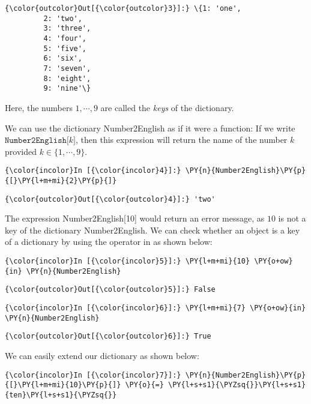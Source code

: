 \begin{Verbatim}[commandchars=\\\{\}]
{\color{outcolor}Out[{\color{outcolor}3}]:} \{1: 'one',
         2: 'two',
         3: 'three',
         4: 'four',
         5: 'five',
         6: 'six',
         7: 'seven',
         8: 'eight',
         9: 'nine'\}
\end{Verbatim}
Here, the numbers \(1, \cdots, 9\) are called the \emph{keys} of the dictionary.

We can use the dictionary Number2English as if it were a function: If we
write \(\texttt{Number2English[}k\texttt{]}\), then this expression will
return the name of the number \(k\) provided \(k \in \{1,\cdots,9\}\).

\begin{Verbatim}[commandchars=\\\{\}]
{\color{incolor}In [{\color{incolor}4}]:} \PY{n}{Number2English}\PY{p}{[}\PY{l+m+mi}{2}\PY{p}{]}
\end{Verbatim}

\begin{Verbatim}[commandchars=\\\{\}]
{\color{outcolor}Out[{\color{outcolor}4}]:} 'two'
\end{Verbatim}       
The expression Number2English{[}10{]} would return an error message, as
\(10\) is not a key of the dictionary Number2English. We can check
whether an object is a key of a dictionary by using the operator in as
shown below:
\begin{Verbatim}[commandchars=\\\{\}]
{\color{incolor}In [{\color{incolor}5}]:} \PY{l+m+mi}{10} \PY{o+ow}{in} \PY{n}{Number2English}
\end{Verbatim}

\begin{Verbatim}[commandchars=\\\{\}]
{\color{outcolor}Out[{\color{outcolor}5}]:} False
\end{Verbatim}
            
\begin{Verbatim}[commandchars=\\\{\}]
{\color{incolor}In [{\color{incolor}6}]:} \PY{l+m+mi}{7} \PY{o+ow}{in} \PY{n}{Number2English}
\end{Verbatim}

\begin{Verbatim}[commandchars=\\\{\}]
{\color{outcolor}Out[{\color{outcolor}6}]:} True
\end{Verbatim}
We can easily extend our dictionary as shown below:
\begin{Verbatim}[commandchars=\\\{\}]
{\color{incolor}In [{\color{incolor}7}]:} \PY{n}{Number2English}\PY{p}{[}\PY{l+m+mi}{10}\PY{p}{]} \PY{o}{=} \PY{l+s+s1}{\PYZsq{}}\PY{l+s+s1}{ten}\PY{l+s+s1}{\PYZsq{}}
\end{Verbatim}

